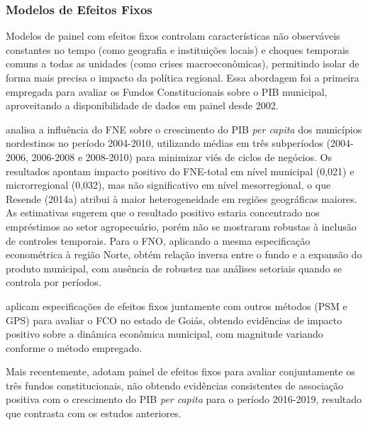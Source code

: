 


\subsubsection{Modelos de Efeitos Fixos}

Modelos de painel com efeitos fixos controlam características não observáveis constantes no tempo (como geografia e instituições locais) e choques temporais comuns a todas as unidades (como crises macroeconômicas), permitindo isolar de forma mais precisa o impacto da política regional. Essa abordagem foi a primeira empregada para avaliar os Fundos Constitucionais sobre o PIB municipal, aproveitando a disponibilidade de dados em painel desde 2002.

 analisa a influência do FNE sobre o crescimento do PIB \textit{per capita} dos municípios nordestinos no período 2004-2010, utilizando médias em três subperíodos (2004-2006, 2006-2008 e 2008-2010) para minimizar viés de ciclos de negócios. Os resultados apontam impacto positivo do FNE-total em nível municipal (0,021) e microrregional (0,032), mas não significativo em nível mesorregional, o que Resende (2014a) atribui à maior heterogeneidade em regiões geográficas maiores. As estimativas sugerem que o resultado positivo estaria concentrado nos empréstimos ao setor agropecuário, porém não se mostraram robustas à inclusão de controles temporais. Para o FNO, aplicando a mesma especificação econométrica à região Norte,  obtém relação inversa entre o fundo e a expansão do produto municipal, com ausência de robustez nas análises setoriais quando se controla por períodos.

 aplicam especificações de efeitos fixos juntamente com outros métodos (PSM e GPS) para avaliar o FCO no estado de Goiás, obtendo evidências de impacto positivo sobre a dinâmica econômica municipal, com magnitude variando conforme o método empregado.

Mais recentemente,  adotam painel de efeitos fixos para avaliar conjuntamente os três fundos constitucionais, não obtendo evidências consistentes de associação positiva com o crescimento do PIB \textit{per capita} para o período 2016-2019, resultado que contrasta com os estudos anteriores.

